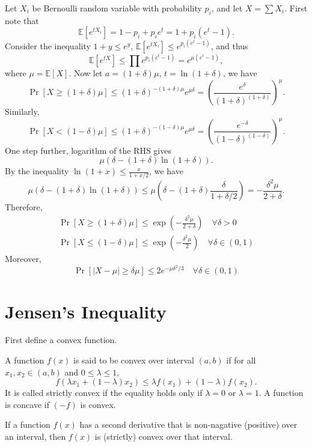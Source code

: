 Let $X_i$ be Bernoulli random variable with probability $p_i$, and let $X=\sum X_i$. First note that
\[
	\mathbb{E}[e^{tX_i}] = 1-p_i + p_ie^t =  1 + p_i(e^{t} - 1).
\]
Consider the inequality $1+y \leq e^y$, $\mathbb{E}[e^{tX_i}] \leq e^{p_i(e^t - 1)}$, and thus
\[
	\mathbb{E}[e^{tX}] \leq \prod e^{p_i(e^t - 1)} = e^{\mu (e^t - 1)},
\]
where $\mu = \mathbb{E}[X]$. Now let $a = (1+\delta)\mu$, $t = \ln(1+\delta)$, we have
\[
\Pr[X \geq (1+\delta)\mu] \leq (1+\delta)^{-(1+\delta)\mu} e^{\mu \delta} = \left(\frac{e^\delta}{(1+\delta)^{(1+\delta)}}\right)^\mu.
\]
Similarly,
\[
	\Pr[X < (1-\delta)\mu] \leq (1+\delta)^{-(1-\delta)\mu} e^{\mu \delta} = \left(\frac{e^{-\delta}}{(1-\delta)^{(1-\delta)}}\right)^\mu.
\]
One step further, logarithm of the RHS gives
\[
	\mu(\delta - (1+\delta)\ln(1+\delta)).
\]
By the inequality $\ln(1+x) \leq \frac{x}{1+x/2}$, we have
\[
	\mu(\delta - (1+\delta)\ln(1+\delta)) \leq \mu(\delta - (1+\delta)\frac{\delta}{1 + \delta/2}) = -\frac{\delta^2\mu}{2+\delta}.
\]
Therefore,
\begin{gather}
	\Pr[X \geq (1+\delta)\mu] \leq \exp \left(- \frac{\delta^2 \mu}{2+\delta} \right) \quad\forall \delta > 0 \\
	\Pr[X \leq (1-\delta)\mu] \leq \exp \left(- \frac{\delta^2 \mu}{2} \right) \quad \forall \delta \in (0,1)
\end{gather}
Moreover,
\begin{equation}
	\Pr[|X - \mu| \geq \delta\mu] \leq 2e^{-\mu\delta^2 / 3} \quad \forall \delta \in (0,1)
\end{equation}

\section{Jensen's Inequality}
\label{sec:jensen}

First define a convex function.

\begin{definition}

A function $f(x)$ is said to be convex over interval $(a,b)$ if for all $x_1,x_2 \in (a,b)$ and $0 \leq \lambda \leq 1$,
\[
	f(\lambda x_1 + (1-\lambda)x_2 ) \leq \lambda f(x_1) + (1 - \lambda)f(x_2).
\]
It is called strictly convex if the equality holds only if $\lambda=0$ or $\lambda=1$.
A function is concave if $(-f)$ is convex.
\end{definition}

\begin{theorem}

If a function $f(x)$ has a second derivative that is non-nagative (positive) over an interval, then $f(x)$ is (strictly) convex over that interval.

\end{theorem}

